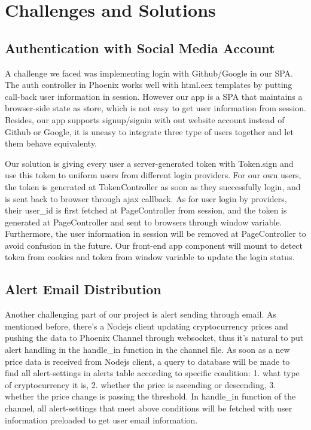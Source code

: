 \section{Challenges and Solutions}
\subsection{Authentication with Social Media Account}
A challenge we faced was implementing login with Github/Google 
in our SPA. The auth controller in Phoenix works well with 
html.eex templates by putting call-back user information in 
session. However our app is a SPA that maintains a browser-side 
state as store, which is not easy to get user information from 
session. Besides, our app supports signup/signin with out website
account instead of Github or Google, it is uneasy to integrate 
three type of users together and let them behave equivalenty.

Our solution is giving every user a server-generated token with 
Token.sign and use this token to uniform users from different 
login providers. For our own users, the token is generated at 
TokenController as soon as they successfully login, and is sent 
back to browser through ajax callback. As for user login by 
providers, their user\_id is first fetched at PageController 
from session, and the token is generated at PageController and 
sent to browsers through window variable. Furthermore, the user 
information in session will be removed at PageController to avoid 
confusion in the future. Our front-end app component will mount 
to detect token from cookies and token from window variable to 
update the login status.

\subsection{Alert Email Distribution}
Another challenging part of our project is alert sending 
through email. As mentioned before, there's a Nodejs client 
updating cryptocurrency prices and pushing the data to Phoenix 
Channel through websocket, thus it's natural to put alert 
handling in the handle\_in function in the channel file. As 
soon as a new price data is received from Nodejs client, a 
query to database will be made to find all alert-settings 
in alerts table according to specific condition: 1. what 
type of cryptocurrency it is, 2. whether the price is ascending 
or descending, 3. whether the price change is passing the 
threshold. In handle\_in function of the channel, all 
alert-settings that meet above conditions will be fetched 
with user information preloaded to get user email information. 


